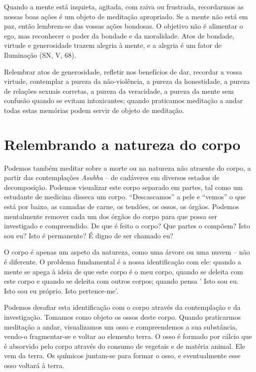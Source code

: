 Quando a mente está inquieta, agitada, com raiva ou frustrada,
recordarmos as nossas boas ações é um objeto de meditação apropriado. Se
a mente não está em paz, então lembrem-se das vossas ações bondosas. O
objetivo não é alimentar o ego, mas reconhecer o poder da bondade e da
moralidade. Atos de bondade, virtude e generosidade trazem alegria à
mente, e a alegria é um fator de Iluminação (SN, V, 68).

Relembrar atos de generosidade, refletir nos benefícios de dar, recordar
a vossa virtude, contemplar a pureza da não-violência, a pureza da
honestidade, a pureza de relações sexuais corretas, a pureza da
veracidade, a pureza da mente sem confusão quando se evitam
intoxicantes; quando praticamos meditação a andar todas estas memórias
podem servir de objeto de meditação.

\section{Relembrando a natureza do corpo}

Podemos também meditar sobre a morte ou na natureza não atraente do
corpo, a partir das contemplações \emph{Asubha} -- de cadáveres em
diversos estados de decomposição. Podemos visualizar este corpo separado
em partes, tal como um estudante de medicina disseca um corpo.
``Descascamos'' a pele e ``vemos'' o que está por baixo, as camadas de
carne, os tendões, os ossos, os órgãos. Podemos mentalmente remover cada
um dos órgãos do corpo para que possa ser investigado e compreendido. De
que é feito o corpo? Que partes o compõem? Isto sou eu? Isto é
permanente? É digno de ser chamado eu?

O corpo é apenas um aspeto da natureza, como uma árvore ou uma nuvem --
não é diferente. O problema fundamental é a nossa identificação com ele:
quando a mente se apega à ideia de que este corpo é o meu corpo, quando
se deleita com este corpo e quando se deleita com outros corpos; quando
pensa ' Isto sou eu. Isto sou eu próprio. Isto pertence-me'.

Podemos desafiar esta identificação com o corpo através da contemplação
e da investigação. Tomamos como objeto os ossos deste corpo. Quando
praticarmos meditação a andar, visualizamos um osso e compreendemos a
sua substância, vendo-o fragmentar-se e voltar ao elemento terra. O osso
é formado por cálcio que é absorvido pelo corpo através do consumo de
vegetais e de matéria animal. Ele vem da terra. Os químicos juntam-se
para formar o osso, e eventualmente esse osso voltará à terra.

